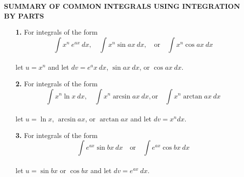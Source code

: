 \documentclass[12pt]{article}
\begin{document}
\sffamily
\begin{tcolorbox}[colback = beige!75!white,
				  sharp corners = all,
				  colframe = beige!75!white]
\textbf{SUMMARY OF COMMON INTEGRALS USING INTEGRATION BY PARTS}
\rmfamily
\begin{enumerate}
\item[\textbf{1.}] For integrals of the form \\
$$ \int x^n \ e^{ax} \ dx, \quad \int x^n \sin ax \ dx, \quad \text{or} \quad \int x^n \cos ax \ dx $$ \\
let $u = x^n$ and let $dv = e^ax \ dx$, $\sin ax \ dx$, or $ \cos ax \ dx$.

\item[\textbf{2.}] For integrals of the form \\
$$ \int x^n \ln x \ dx, \quad \int x^n \arcsin ax \ dx, \text{or} \quad \int x^n \arctan ax \ dx $$ \\
let $u = \ln x$, $\arcsin ax$, or $\arctan ax$ and let $dv = x^n dx$.

\item[\textbf{3.}] For integrals of the form \\
$$ \int e^{ax} \sin bx \ dx \quad \text{or} \quad \int e^{ax} \cos bx \ dx$$ \\
let $u = \sin bx$ or $\cos bx$ and let $dv = e^{ax} \ dx$.

\end{enumerate}
\end{tcolorbox}
\end{document}
